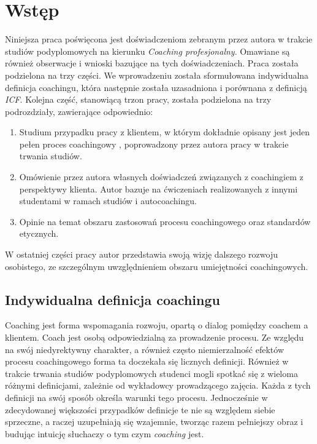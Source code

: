 \chapter{Wstęp}


Niniejsza praca poświęcona jest doświadczeniom zebranym przez autora w trakcie studiów podyplomowych na kierunku
\emph{Coaching profesjonalny}. Omawiane są również obserwacje i wnioski bazujące na tych doświadczeniach.
Praca została podzielona na trzy części. We wprowadzeniu została sformułowana indywidualna definicja coachingu,
która następnie została uzasadniona i porównana z definicją \emph{ICF}. Kolejna część, stanowiącą trzon pracy,
została podzielona na trzy podrozdziały, zawierające odpowiednio:
\begin{enumerate}
  \item Studium przypadku pracy z klientem, w którym dokładnie opisany jest jeden pełen proces coachingowy  , poprowadzony
      przez autora pracy w trakcie trwania studiów.
  \item Omówienie przez autora własnych doświadczeń związanych z coachingiem z perspektywy klienta. Autor bazuje na
      ćwiczeniach realizowanych z innymi studentami w ramach studiów i autocoachingu.
  \item Opinie na temat obszaru zastosowań procesu coachingowego oraz standardów etycznych.
\end{enumerate}
W ostatniej części pracy autor przedstawia swoją wizję dalszego rozwoju osobistego, ze szczególnym uwzględnieniem
obszaru umiejętności coachingowych. \\

\section{Indywidualna definicja coachingu}
Coaching jest forma wspomagania rozwoju, opartą o dialog pomiędzy coachem a klientem. Coach jest osobą odpowiedzialną za prowadzenie procesu.
Ze względu na swój niedyrektywny charakter, a również często niemierzalność efektów procesu coachingowego forma ta doczekała się
licznych definicji. Również w trakcie trwania studiów podyplomowych studenci mogli spotkać się z wieloma różnymi definicjami,
zależnie od wykładowcy prowadzącego zajęcia. Każda z tych definicji na swój sposób określa warunki tego procesu.
Jednocześnie w zdecydowanej większości przypadków definicje te nie są względem siebie sprzeczne, a raczej uzupełniają się
wzajemnie, tworząc razem pełniejszy obraz i budując intuicję słuchaczy o tym czym \emph{coaching} jest.

